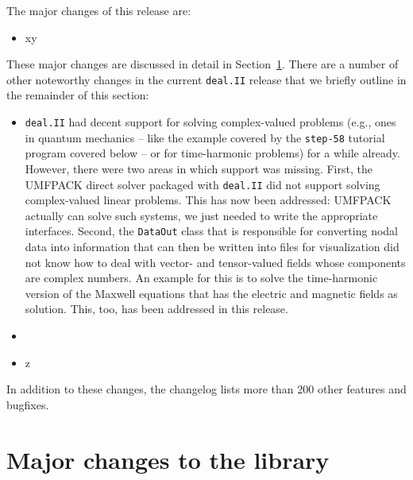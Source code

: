 \documentclass{ansarticle-preprint}
\newcommand{\specialword}[1]{\texttt{#1}}
\newcommand{\dealii}{{\specialword{deal.II}}\xspace}
\begin{document}
The major changes of this release are:
%
\begin{itemize}
\item xy 
\end{itemize}
%
These major changes are discussed in detail in Section~\ref{sec:major}. There
are a number of other noteworthy changes in the current \dealii{} release
that we briefly outline in the remainder of this section:
%
\begin{itemize}
\item \dealii{} had decent support for solving complex-valued problems
  (e.g., ones in quantum mechanics -- like the example covered by the
  \texttt{step-58} tutorial program covered below -- or for
  time-harmonic problems) for a while already. However, there were two
  areas in which support was missing. First, the UMFPACK direct solver
  packaged with \dealii{} did not support solving complex-valued
  linear problems. This has now been addressed: UMFPACK actually can
  solve such systems, we just needed to write the appropriate
  interfaces. Second, the \texttt{DataOut} class that is responsible
  for converting nodal data into information that can then be written
  into files for visualization did not know how to deal with vector-
  and tensor-valued fields whose components are complex numbers. An
  example for this is to solve the time-harmonic version of the
  Maxwell equations that has the electric and magnetic fields as
  solution. This, too, has been addressed in this release.
  \item {}
\item z 
\end{itemize}
%
In addition to these changes, the changelog lists more than 200 other
features and bugfixes.




\section{Major changes to the library}
\label{sec:major}
\end{document}

